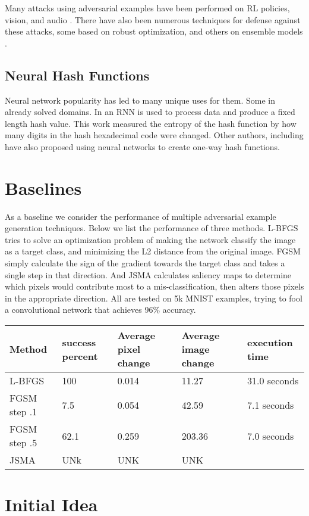 \documentclass{article}
\begin{document}
Many attacks using adversarial examples have been performed on RL policies, vision,
and audio \cite{policy,intriguing,audio}. There have also been numerous techniques
for defense against these attacks, some based on robust optimization, and others
on ensemble models \cite{robust,ensemble}.

\subsection{Neural Hash Functions}

Neural network popularity has led to many unique uses for them. Some in already
solved domains. In \cite{hash1} an RNN is used to process data and produce
a fixed length hash value. This work measured the entropy of the hash function
by how many digits in the hash hexadecimal code were changed. Other authors,
including \cite{hash2} have also proposed using neural networks to create
one-way hash functions.

\section{Baselines}

As a baseline we consider the performance of multiple adversarial example
generation techniques. Below we list the performance of three methods. L-BFGS
tries to solve an optimization problem of making the network classify the image as
a target class, and minimizing the L2 distance from the original image. FGSM simply
calculate the sign of the gradient towards the target class and takes a single 
step in that direction. And JSMA calculates saliency maps to determine which pixels
would contribute most to a mis-classification, then alters those pixels in the
appropriate direction. All are tested on 5k MNIST examples, trying to fool
a convolutional network that achieves 96\% accuracy.

\begin{tabular}{l | l l l l}
    Method & success percent & Average pixel change & Average image change & execution time\\ \hline
    L-BFGS & 100 & 0.014 & 11.27 & 31.0 seconds \\
    FGSM step .1 & 7.5 & 0.054 & 42.59 & 7.1 seconds \\
    FGSM step .5 & 62.1 & 0.259 & 203.36 & 7.0 seconds \\
    JSMA & UNk & UNK & UNK
\end{tabular}

\section{Initial Idea}
\end{document}
